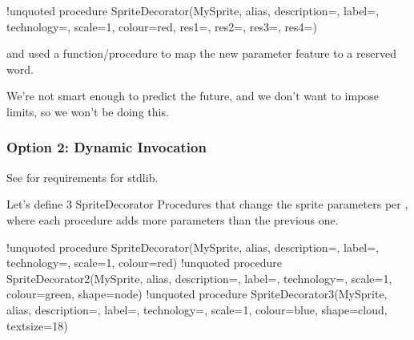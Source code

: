 \documentclass[letterpaper,10pt,english]{sphinxmanual}
\begin{document}
\begin{sphinxVerbatim}[commandchars=\\\{\}]
!unquoted procedure \PYGZdl{}SpriteDecorator(\PYGZdl{}MySprite, \PYGZdl{}alias, \PYGZdl{}description=\PYGZdq{}\PYGZdq{}, \PYGZdl{}label=\PYGZdq{}\PYGZdq{}, \PYGZdl{}technology=\PYGZdq{}\PYGZdq{}, \PYGZdl{}scale=1, \PYGZdl{}colour=\PYGZdq{}red\PYGZdq{}, \PYGZdl{}res1=\PYGZdq{}\PYGZdq{}, \PYGZdl{}res2=\PYGZdq{}\PYGZdq{}, \PYGZdl{}res3=\PYGZdq{}\PYGZdq{}, \PYGZdl{}res4=\PYGZdq{}\PYGZdq{})
\end{sphinxVerbatim}

and used a function/procedure to map the new parameter feature to a reserved word.

We’re not smart enough to predict the future, and we don’t want to impose limits, so we won’t be doing this.


\subsubsection{Option 2: Dynamic Invocation}
\label{\detokenize{Stdlib/StandardisingStdLib:option-2-dynamic-invocation}}
See {\hyperref[\detokenize{Stdlib/stdlibRequirements:stdlibreqs-label}]{}} for requirements for stdlib.

Let’s define 3 SpriteDecorator Procedures that change the sprite parameters per {\hyperref[\detokenize{Stdlib/stdlibRequirements:stdlibreqs-label}]{}}, where each procedure adds more parameters than the previous one.

\begin{sphinxVerbatim}[commandchars=\\\{\}]
!unquoted procedure \PYGZdl{}SpriteDecorator(\PYGZdl{}MySprite, \PYGZdl{}alias, \PYGZdl{}description=\PYGZdq{}\PYGZdq{}, \PYGZdl{}label=\PYGZdq{}\PYGZdq{}, \PYGZdl{}technology=\PYGZdq{}\PYGZdq{}, \PYGZdl{}scale=1, \PYGZdl{}colour=\PYGZdq{}red\PYGZdq{})
!unquoted procedure \PYGZdl{}SpriteDecorator2(\PYGZdl{}MySprite, \PYGZdl{}alias, \PYGZdl{}description=\PYGZdq{}\PYGZdq{}, \PYGZdl{}label=\PYGZdq{}\PYGZdq{}, \PYGZdl{}technology=\PYGZdq{}\PYGZdq{}, \PYGZdl{}scale=1, \PYGZdl{}colour=\PYGZdq{}green\PYGZdq{}, \PYGZdl{}shape=\PYGZdq{}node\PYGZdq{})
!unquoted procedure \PYGZdl{}SpriteDecorator3(\PYGZdl{}MySprite, \PYGZdl{}alias, \PYGZdl{}description=\PYGZdq{}\PYGZdq{}, \PYGZdl{}label=\PYGZdq{}\PYGZdq{}, \PYGZdl{}technology=\PYGZdq{}\PYGZdq{}, \PYGZdl{}scale=1, \PYGZdl{}colour=\PYGZdq{}blue\PYGZdq{}, \PYGZdl{}shape=\PYGZdq{}cloud\PYGZdq{}, \PYGZdl{}textsize=\PYGZdq{}18\PYGZdq{})
\end{sphinxVerbatim}
\end{document}
